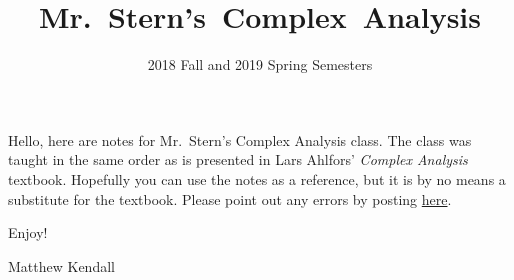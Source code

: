 \documentclass[12pt]{scrartcl}
\title{Mr.\ Stern's\ Complex\ Analysis}
\subtitle{2018 Fall and 2019 Spring Semesters}
\date{}
\begin{document}
\maketitle


Hello, here are notes for Mr.\ Stern's Complex Analysis class.
The class was taught in the same order as is presented in Lars Ahlfors'
\textit{Complex Analysis} textbook.
Hopefully you can use the notes as a reference, but it is by no means
a substitute for the textbook.
Please point out any errors by posting \href{https://github.com/mkendall17/cmplxnotes1819}{here}.

\vspace{0.3cm}
Enjoy!

\vspace{0.3cm}
Matthew Kendall

\tableofcontents
\pagebreak





















\end{document}
